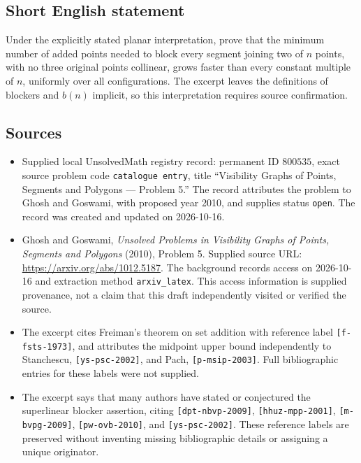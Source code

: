 \documentclass[11pt]{article}
\begin{document}
\subsection{Short English statement}
Under the explicitly stated planar interpretation, prove that the minimum number of added points needed to block every segment joining two of $n$ points, with no three original points collinear, grows faster than every constant multiple of $n$, uniformly over all configurations. The excerpt leaves the definitions of blockers and $b(n)$ implicit, so this interpretation requires source confirmation.
\subsection{Sources}
\begin{itemize}
\item Supplied local UnsolvedMath registry record: permanent ID $800535$, exact source problem code \texttt{catalogue entry}, title ``Visibility Graphs of Points, Segments and Polygons --- Problem 5.'' The record attributes the problem to Ghosh and Goswami, with proposed year 2010, and supplies status \texttt{open}. The record was created and updated on 2026-10-16.
\item Ghosh and Goswami, \emph{Unsolved Problems in Visibility Graphs of Points, Segments and Polygons} (2010), Problem 5. Supplied source URL: \url{https://arxiv.org/abs/1012.5187}. The background records access on 2026-10-16 and extraction method \texttt{arxiv\_latex}. This access information is supplied provenance, not a claim that this draft independently visited or verified the source.
\item The excerpt cites Freiman's theorem on set addition with reference label \texttt{[f-fsts-1973]}, and attributes the midpoint upper bound independently to Stanchescu, \texttt{[ys-psc-2002]}, and Pach, \texttt{[p-msip-2003]}. Full bibliographic entries for these labels were not supplied.
\item The excerpt says that many authors have stated or conjectured the superlinear blocker assertion, citing \texttt{[dpt-nbvp-2009]}, \texttt{[hhuz-mpp-2001]}, \texttt{[m-bvpg-2009]}, \texttt{[pw-ovb-2010]}, and \texttt{[ys-psc-2002]}. These reference labels are preserved without inventing missing bibliographic details or assigning a unique originator.
\end{itemize}
\end{document}
